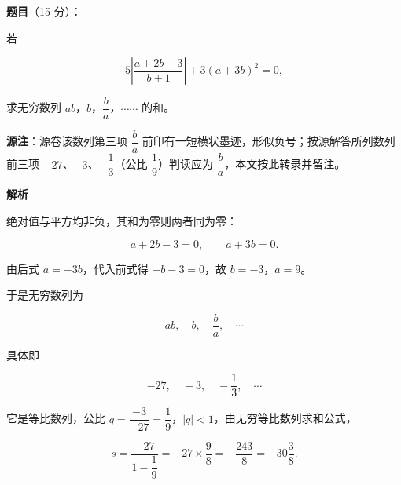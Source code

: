 \begin{answer}

\textbf{题目}（15 分）：

若

\nopagebreak[4]
\[
5\left|\frac{a+2b-3}{b+1}\right|+3(a+3b)^2=0,
\]

求无穷数列 $ab$，$b$，$\dfrac{b}{a}$，$\cdots\cdots$ 的和。

\begin{gktip}
\textbf{源注}：源卷该数列第三项 $\dfrac{b}{a}$ 前印有一短横状墨迹，形似负号；按源解答所列数列前三项 $-27$、$-3$、$-\dfrac13$（公比 $\dfrac19$）判读应为 $\dfrac{b}{a}$，本文按此转录并留注。
\end{gktip}

\textbf{解析}

绝对值与平方均非负，其和为零则两者同为零：

\nopagebreak[4]
\[
a+2b-3=0,
\qquad a+3b=0.
\]

由后式 $a=-3b$，代入前式得 $-b-3=0$，故 $b=-3$，$a=9$。

于是无穷数列为

\nopagebreak[4]
\[
ab,\quad b,\quad \frac{b}{a},\quad \cdots
\]

具体即

\nopagebreak[4]
\[
-27,\quad -3,\quad -\frac13,\quad \cdots
\]

它是等比数列，公比 $q=\dfrac{-3}{-27}=\dfrac19$，$|q|<1$，由无穷等比数列求和公式，

\nopagebreak[4]
\[
s=\frac{-27}{1-\dfrac19}=-27\times\frac98=-\frac{243}{8}=-30\frac38.
\]


\end{answer}
